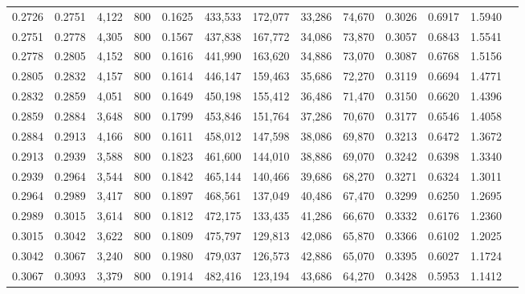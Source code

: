 \begin{tabular}{rrrrrrrrrrrrr}
0.2726 & 0.2751 &  4,122 &   800 &                                     0.1625 & 433,533 & 172,077 &  33,286 &  74,670 & 0.3026 & 0.6917 & 1.5940 \\
0.2751 & 0.2778 &  4,305 &   800 &                                     0.1567 & 437,838 & 167,772 &  34,086 &  73,870 & 0.3057 & 0.6843 & 1.5541 \\
0.2778 & 0.2805 &  4,152 &   800 &                                     0.1616 & 441,990 & 163,620 &  34,886 &  73,070 & 0.3087 & 0.6768 & 1.5156 \\
0.2805 & 0.2832 &  4,157 &   800 &                                     0.1614 & 446,147 & 159,463 &  35,686 &  72,270 & 0.3119 & 0.6694 & 1.4771 \\
0.2832 & 0.2859 &  4,051 &   800 &                                     0.1649 & 450,198 & 155,412 &  36,486 &  71,470 & 0.3150 & 0.6620 & 1.4396 \\
0.2859 & 0.2884 &  3,648 &   800 &                                     0.1799 & 453,846 & 151,764 &  37,286 &  70,670 & 0.3177 & 0.6546 & 1.4058 \\
0.2884 & 0.2913 &  4,166 &   800 &                                     0.1611 & 458,012 & 147,598 &  38,086 &  69,870 & 0.3213 & 0.6472 & 1.3672 \\
0.2913 & 0.2939 &  3,588 &   800 &                                     0.1823 & 461,600 & 144,010 &  38,886 &  69,070 & 0.3242 & 0.6398 & 1.3340 \\
0.2939 & 0.2964 &  3,544 &   800 &                                     0.1842 & 465,144 & 140,466 &  39,686 &  68,270 & 0.3271 & 0.6324 & 1.3011 \\
0.2964 & 0.2989 &  3,417 &   800 &                                     0.1897 & 468,561 & 137,049 &  40,486 &  67,470 & 0.3299 & 0.6250 & 1.2695 \\
0.2989 & 0.3015 &  3,614 &   800 &                                     0.1812 & 472,175 & 133,435 &  41,286 &  66,670 & 0.3332 & 0.6176 & 1.2360 \\
0.3015 & 0.3042 &  3,622 &   800 &                                     0.1809 & 475,797 & 129,813 &  42,086 &  65,870 & 0.3366 & 0.6102 & 1.2025 \\
0.3042 & 0.3067 &  3,240 &   800 &                                     0.1980 & 479,037 & 126,573 &  42,886 &  65,070 & 0.3395 & 0.6027 & 1.1724 \\
0.3067 & 0.3093 &  3,379 &   800 &                                     0.1914 & 482,416 & 123,194 &  43,686 &  64,270 & 0.3428 & 0.5953 & 1.1412 \\

\end{tabular}
